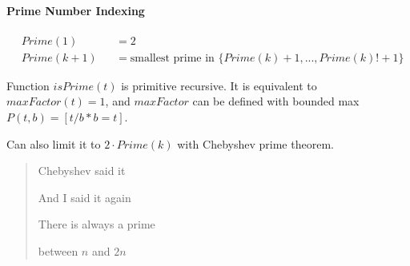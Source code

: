 \paragraph{Prime Number Indexing}

\begin{align*}
& Prime(1) &&= 2\\
& Prime(k+1) &&= \text{smallest prime in } \{Prime(k)+1, ..., Prime(k)!+1\} 
\end{align*}

Function $isPrime(t)$ is primitive recursive. It is equivalent to $maxFactor(t) = 1$, and $maxFactor$ can be defined with bounded max $P(t,b) = [t/b*b = t]$.

Can also limit it to \(2\cdot Prime(k)\) with Chebyshev prime theorem.

\begin{quote} 
Chebyshev said it

And I said it again

There is always a prime

between $n$ and $2n$
\end{quote}

